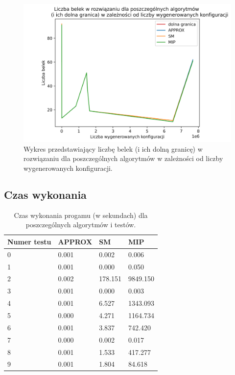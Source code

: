 \begin{figure}[H]
	\begin{center}
		\includegraphics[width=12cm]{plots/res_configs}
		\caption{Wykres przedstawiający liczbę belek (i ich dolną granicę) w rozwiązaniu dla poszczególnych algorytmów w zależności od liczby wygenerowanych konfiguracji.}
	\end{center}
\end{figure}

\subsection{Czas wykonania}


\begin{table}[H] 
	\begin{center}
		\begin{tabular}{|p{3cm}|p{3cm}|p{3cm}|p{3cm}| } \hline
			Numer testu & APPROX & SM & MIP\\ 
			\hline
			0 & 0.001 & 0.002 & 0.006\\ 
			1 & 0.001 & 0.000 & 0.050\\ 
			2 & 0.002 & 178.151 & 9849.150\\ 
			3 & 0.001 & 0.000 & 0.003\\ 
			4 & 0.001 & 6.527 & 1343.093\\ 
			5 & 0.000 & 4.271 & 1164.734\\ 
			6 & 0.001 & 3.837 & 742.420\\ 
			7 & 0.000 & 0.002 & 0.017\\ 
			8 & 0.001 & 1.533 & 417.277\\ 
			9 & 0.001 & 1.804 & 84.618\\ 
			\hline
		\end{tabular}
		\caption{Czas wykonania progamu (w sekundach) dla poszczególnych algorytmów i testów.}
	\end{center}
\end{table}

